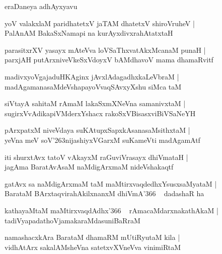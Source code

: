 \documentclass[twoside,12pt,openright]{book}
\def\S{\char'263}
\newcounter{shloka}[chapter]
\begin{document}
\begin{center}
eraDaneya adhAyxyavu
\end{center}

\begin{shloka}%
yoV valakxlaM paridhatetxV jaTAM dhatetxV shiroVruheV |\\
PalAnAM BakaSxNamapi na kurAyxdivxrahAtatxtaH 
\end{shloka}

\begin{shloka}%
parasitxrXV yasayx mAteVva loVSaThxvatAkxMcanaM punaH |\\
parxjAH putArxniveVkeSxVdoyxV bAMdhavoV mama dhamaRvitf
\end{shloka}

\begin{shloka}%
madivxyoVgajaduHKAginx jAvxlAdagadhxkaLeVbraM |\\
madAgamanasaMdeVshapayoVvaqSAvxyXshu siMca taM 
\end{shloka}

\begin{shloka}%
siVtayA sahitaM rAmaM lakaSxmXNeVna samanivxtaM |\\
sugirxVvAdikapiVMderxYshacx rakoSxVBisasxviBiVSaNeYH
\end{shloka}

\begin{shloka}%
pArxpatxM niveVdaya suKAtupxSapxkAsanasaMsithxtaM |\\
yeVna meV soV\S nijashiyxVGarxM suKameVti madAgamAtf
\end{shloka}

\begin{shloka}%
iti shurxtAvx tatoV vAkayxM raGuviVrasayx dhiVmataH |\\
jagAma BaratAvAsaM naMdigArxmaM nideVshakaqtf
\end{shloka}

\begin{shloka}%
gatAvx sa naMdigArxmaM taM maMtirxvaqdedhxYsusxsaMyataM |\\
BarataM BArxtaqvirahAkilxnanxM dhiVmA\char'366 ~  dadashaR ha
\end{shloka}

\begin{shloka}%
kathayaMtaM maMtirxvaqdAdhx\char'366 ~ rAmacaMdarxnakathAkaM |\\
tadiVyapadathoVjamakaraMdasuniBaRraM 
\end{shloka}

\begin{shloka}%
namashacxkAra BarataM dhamaRM mUtiRyutaM kila |\\
vidhAtArx sakalAMsheVna satetxvXVneVva vinimiRtaM 
\end{shloka}
\end{document}
